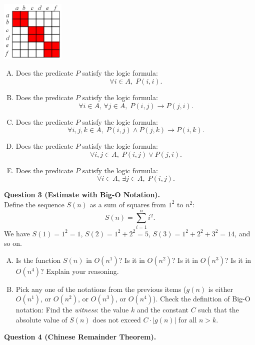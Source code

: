 \documentclass[jou]{apa6}
\begin{document}
\begin{center}
\includegraphics[width=1.2in]{midterm/relation.png}
\end{center}

\begin{enumerate}[(A)]
\item Does the predicate $P$ satisfy the logic formula:
$$\forall i \in A,\;P(i,i).$$
\item Does the predicate $P$ satisfy the logic formula:
$$\forall i \in A,\,\forall j \in A,\;P(i,j) \rightarrow P(j,i).$$
\item Does the predicate $P$ satisfy the logic formula:
$$\forall i,j,k \in A,\;P(i,j) \wedge P(j,k) \rightarrow P(i,k).$$
\item Does the predicate $P$ satisfy the logic formula:
$$\forall i,j \in A,\;P(i,j) \vee P(j,i).$$
\item Does the predicate $P$ satisfy the logic formula:
$$\forall i \in A,\, \exists j \in A,\;P(i,j).$$
\end{enumerate}

\vspace{10pt}
{\bf Question 3 (Estimate with Big-O Notation).}\\
Define the sequence $S(n)$ as a sum of squares from $1^2$ to $n^2$:
$$S(n) = \sum\limits_{i=1}^n i^2.$$
We have $S(1) = 1^2 = 1$, $S(2) = 1^2 + 2^2 = 5$, 
$S(3) = 1^2 + 2^2 + 3^2 = 14$,
and so on. 

\begin{enumerate}[(A)]
\item Is the function $S(n)$ in $O(n^1)$? 
Is it in $O(n^2)$? Is it in $O(n^3)$? Is it in $O(n^4)$? 
Explain your reasoning. 
\item Pick any one of the notations from the previous items 
($g(n)$ is either $O(n^1)$, or $O(n^2)$, or $O(n^3)$, or $O(n^4)$). 
Check the definition of Big-O notation: Find the {\em witness}: the value $k$ and the constant $C$
such that the absolute value of $S(n)$ does not exceed $C\cdot{}|g(n)|$ for all $n > k$.
\end{enumerate}


\vspace{10pt}
{\bf Question 4 (Chinese Remainder Theorem).}
\end{document}
